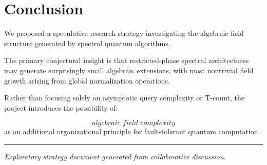 \documentclass[12pt,a4paper]{article}
\begin{document}

\section{Conclusion}

We proposed a speculative research strategy investigating the algebraic field structure generated by spectral quantum algorithms.

The primary conjectural insight is that restricted-phase spectral architectures may generate surprisingly small algebraic extensions, with most nontrivial field growth arising from global normalization operations.

Rather than focusing solely on asymptotic query complexity or T-count, the project introduces the possibility of:

\[
\textit{algebraic field complexity}
\]
as an additional organizational principle for fault-tolerant quantum computation.

\vspace{2em}

\hrule

\vspace{1em}

\noindent
\textit{
Exploratory strategy document generated from collaborative discussion.
}
\end{document}
